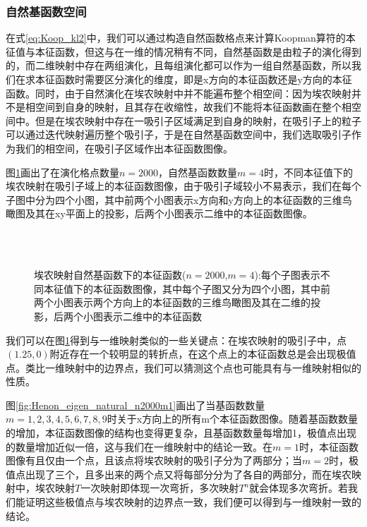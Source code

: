 \subsubsection{自然基函数空间}
在式\eqref{eq:Koop_kl2}中，我们可以通过构造自然函数格点来计算Koopman算符的本征值与本征函数，但这与在一维的情况稍有不同，自然基函数是由粒子的演化得到的，而二维映射中存在两组演化，且每组演化都可以作为一组自然基函数，所以我们在求本征函数时需要区分演化的维度，即是x方向的本征函数还是y方向的本征函数。同时，由于自然演化在埃农映射中并不能遍布整个相空间：因为埃农映射并不是相空间到自身的映射，且其存在收缩性，故我们不能将本征函数画在整个相空间中。但是在埃农映射中存在一吸引子区域满足到自身的映射，在吸引子上的粒子可以通过迭代映射遍历整个吸引子，于是在自然基函数空间中，我们选取吸引子作为我们的相空间，在吸引子区域作出本征函数图像。

图\ref{fig:Henon_eigen_natural_n2000m4_figure1}画出了在演化格点数量$n=2000$，自然基函数数量$m=4$时，不同本征值下的埃农映射在吸引子域上的本征函数图像，由于吸引子域较小不易表示，我们在每个子图中分为四个小图，其中前两个小图表示x方向和y方向上的本征函数的三维鸟瞰图及其在xy平面上的投影，后两个小图表示二维中的本征函数图像。
\begin{figure}
    \centering
    \\
    \\
    \caption[埃农映射自然基函数下的本征函数]{埃农映射自然基函数下的本征函数($n=2000$,$m=4$):每个子图表示不同本征值下的本征函数图像，其中每个子图又分为四个小图，其中前两个小图表示两个方向上的本征函数的三维鸟瞰图及其在二维的投影，后两个小图表示二维中的本征函数}\label{fig:Henon_eigen_natural_n2000m4_figure1}
\end{figure}

我们可以在图\ref{fig:Henon_eigen_natural_n2000m4_figure1}得到与一维映射类似的一些关键点：在埃农映射的吸引子中，点$(1.25,0)$附近存在一个较明显的转折点，在这个点上的本征函数总是会出现极值点。类比一维映射中的边界点，我们可以猜测这个点也可能具有与一维映射相似的性质。

图\ref{fig:Henon_eigen_natural_n2000m1}画出了当基函数数量$m=1,2,3,4,5,6,7,8,9$时关于x方向上的所有m个本征函数图像。随着基函数数量的增加，本征函数图像的结构也变得更复杂，且基函数数量每增加1，极值点出现的数量增加近似一倍，这与我们在一维映射中的结论一致。在$m=1$时，本征函数图像有且仅由一个点，且该点将埃农映射的吸引子分为了两部分；当$m=2$时，极值点出现了三个，且多出来的两个点又将每部分分为了各自的两部分，而在埃农映射中，埃农映射$T$一次映射即体现一次弯折，多次映射$T^n$就会体现多次弯折。若我们能证明这些极值点与埃农映射的边界点一致，我们便可以得到与一维映射一致的结论。


